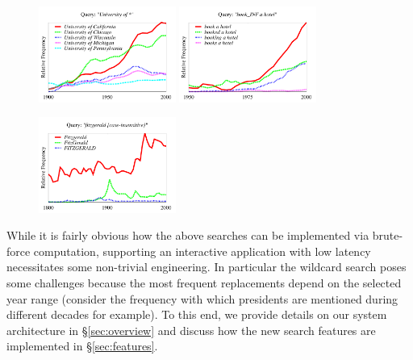 \documentclass[11pt]{article}
\begin{document}
\begin{savenotes}
\begin{figure}
\includegraphics[width=0.40\textwidth]{graphs/university}\hspace{2\unitlength}%
\includegraphics[width=0.40\textwidth]{graphs/book}\vspace{2\unitlength}\par
\includegraphics[width=0.40\textwidth]{graphs/fitzgerald}\hspace{2\unitlength}%
\parbox[b][60\unitlength]{.4\textwidth}%
{}
\end{figure}
\end{savenotes}

While it is fairly obvious how the above searches can be implemented via brute-force computation, supporting an interactive application with low latency necessitates some non-trivial engineering. In particular the wildcard search poses some challenges because the most frequent replacements depend on the selected year range (consider the frequency with which presidents are mentioned during different decades for example). To this end, we provide details on our system architecture in \S\ref{sec:overview}  and discuss how the new search features are implemented in \S\ref{sec:features}.
\end{document}
